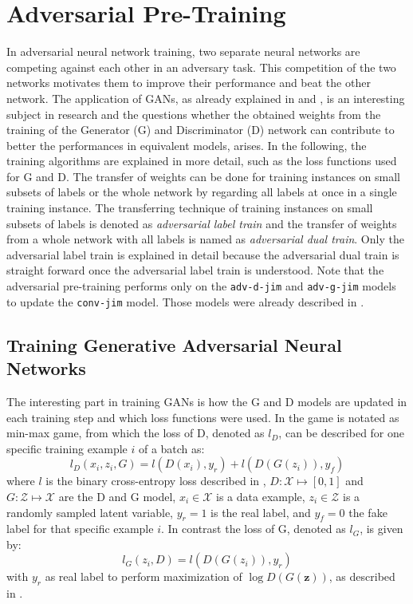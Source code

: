 
\section{Adversarial Pre-Training}\label{sec:nn_adv}
In adversarial neural network training, two separate neural networks are competing against each other in an adversary task.
This competition of the two networks motivates them to improve their performance and beat the other network.
The application of GANs, as already explained in  and , is an interesting subject in research and the questions whether the obtained weights from the training of the Generator (G) and Discriminator (D) network can contribute to better the performances in equivalent models, arises.
In the following, the training algorithms are explained in more detail, such as the loss functions used for G and D.
The transfer of weights can be done for training instances on small subsets of labels or the whole network by regarding all labels at once in a single training instance.
The transferring technique of training instances on small subsets of labels is denoted as \emph{adversarial label train} and the transfer of weights from a whole network with all labels is named as \emph{adversarial dual train}.
Only the adversarial label train is explained in detail because the adversarial dual train is straight forward once the adversarial label train is understood.
Note that the adversarial pre-training performs only on the \texttt{adv-d-jim} and \texttt{adv-g-jim} models to update the \texttt{conv-jim} model.
Those models were already described in .



\subsection{Training Generative Adversarial Neural Networks}\label{sec:nn_adv_train}
The interesting part in training GANs is how the G and D models are updated in each training step and which loss functions were used.
In  the game is notated as min-max game, from which the loss of D, denoted as $l_D$, can be described for one specific training example $i$ of a batch as:
\begin{equation}
  l_D(x_i, z_i, G) = l(D(x_i), y_r) + l(D(G(z_i)), y_f)
\end{equation}
where $l$ is the binary cross-entropy loss described in , $D: \mathcal{X} \mapsto [0, 1]$ and $G: \mathcal{Z} \mapsto \mathcal{X}$ are the D and G model, $x_i \in \mathcal{X}$ is a data example, $z_i \in \mathcal{Z}$ is a randomly sampled latent variable, $y_r = 1$ is the real label, and $y_f = 0$ the fake label for that specific example $i$.
In contrast the loss of G, denoted as $l_G$, is given by:
\begin{equation}
  l_G(z_i, D) =  l(D(G(z_i)), y_r)
\end{equation}
with $y_r$ as real label to perform maximization of $\log D(G(\bm{z}))$, as described in .

